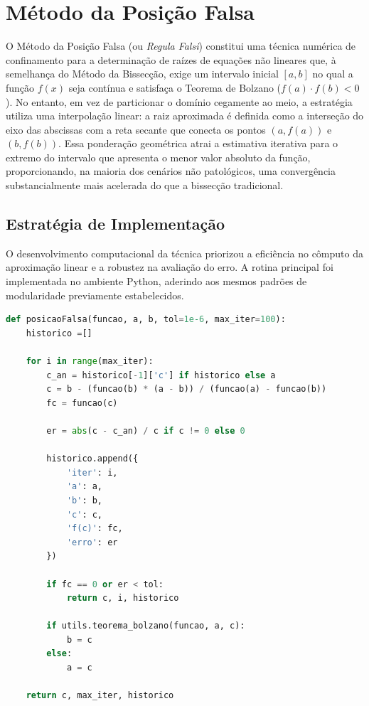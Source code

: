 \section{Método da Posição Falsa}
\label{sec:metodo_posicao_falsa}

O Método da Posição Falsa (ou \textit{Regula Falsi}) constitui uma técnica numérica de confinamento para a determinação de raízes de equações não lineares que, à semelhança do Método da Bissecção, exige um intervalo inicial $[a, b]$ no qual a função $f(x)$ seja contínua e satisfaça o Teorema de Bolzano ($f(a) \cdot f(b) < 0$). No entanto, em vez de particionar o domínio cegamente ao meio, a estratégia utiliza uma interpolação linear: a raiz aproximada é definida como a interseção do eixo das abscissas com a reta secante que conecta os pontos $(a, f(a))$ e $(b, f(b))$. Essa ponderação geométrica atrai a estimativa iterativa para o extremo do intervalo que apresenta o menor valor absoluto da função, proporcionando, na maioria dos cenários não patológicos, uma convergência substancialmente mais acelerada do que a bissecção tradicional.

\subsection{Estratégia de Implementação}
\label{subsec:estrategia_implementacao_posicao_falsa}

O desenvolvimento computacional da técnica priorizou a eficiência no cômputo da aproximação linear e a robustez na avaliação do erro. A rotina principal foi implementada no ambiente Python, aderindo aos mesmos padrões de modularidade previamente estabelecidos.

\begin{lstlisting}[language=Python, caption={Código de implementação do Método da Posição Falsa}, label={lst:posicao_falsa_codigo}]
def posicaoFalsa(funcao, a, b, tol=1e-6, max_iter=100):
    historico =[] 
    
    for i in range(max_iter):
        c_an = historico[-1]['c'] if historico else a  
        c = b - (funcao(b) * (a - b)) / (funcao(a) - funcao(b))
        fc = funcao(c)

        er = abs(c - c_an) / c if c != 0 else 0
       
        historico.append({
            'iter': i, 
            'a': a, 
            'b': b, 
            'c': c, 
            'f(c)': fc,
            'erro': er
        })
        
        if fc == 0 or er < tol:
            return c, i, historico
            
        if utils.teorema_bolzano(funcao, a, c):
            b = c
        else:
            a = c
            
    return c, max_iter, historico
\end{lstlisting}

